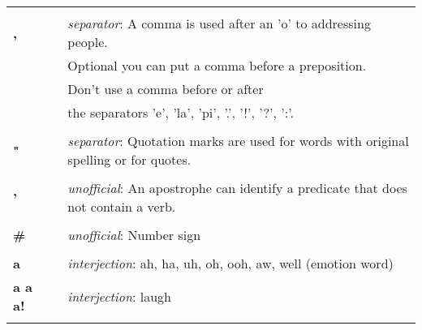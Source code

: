 \begin{supertabular}{p{2,5cm}|ll}
                                 &  &                                                                                                            \\ %
    \textbf{,}                   &  & \textit{separator}: A comma is used after an 'o' to addressing people.                                     \\ &&  Optional you can put a comma before a preposition. \\ && Don't use a comma before or after \\ && the separators 'e', 'la', 'pi', '.', '!', '?', ':'.  \\
                                 &  &                                                                                                            \\ %
    \textbf{"}                   &  & \textit{separator}: Quotation marks are used for words with original spelling or for quotes.               \\
                                 &  &                                                                                                            \\ %
    \textbf{'}                   &  & \textit{unofficial}: An apostrophe can identify a predicate that does not contain a verb.                  \\
                                 &  &                                                                                                            \\ %
    \textbf{\#}                  &  & \textit{unofficial}: Number sign                                                                           \\
                                 &  &                                                                                                            \\ %
    \textbf{a}                   &  & \textit{interjection}: ah, ha, uh, oh, ooh, aw, well (emotion word)                                        \\
    \textbf{a a a!}              &  & \textit{interjection}: laugh                                                                               \\
                                 &  &                                                                                                            \\ %

\end{supertabular}

